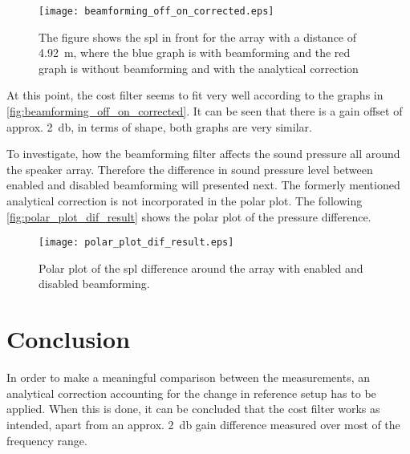   \begin{figure}[H]
	\centering
	\texttt{[image: beamforming\_off\_on\_corrected.eps]}
	\caption{The figure shows the \gls{spl} in front for the array with a distance of \SI{4.92}{\meter}, where the blue graph is with beamforming and the red graph is without beamforming and with the analytical correction}
		\label{fig:beamforming_off_on_corrected}
\end{figure}

At this point, the cost filter seems to fit very well according to the graphs in \autoref{fig:beamforming_off_on_corrected}. It can be seen that there is a gain offset of approx. \SI{2}{\decibel}, in terms of shape, both graphs are very similar. 

To investigate, how the beamforming filter affects the sound pressure all around the speaker array. Therefore the difference in sound pressure level between enabled and disabled beamforming will presented next. The formerly mentioned analytical correction is not incorporated in the polar plot. The following \autoref{fig:polar_plot_dif_result} shows the polar plot of the pressure difference. 


 \begin{figure}[H]
	\centering
	\texttt{[image: polar\_plot\_dif\_result.eps]}
	\caption{Polar plot of the \gls{spl} difference around the array with enabled and disabled beamforming.}
		\label{fig:polar_plot_dif_result}
\end{figure}




\section{Conclusion}
In order to make a meaningful comparison between the measurements, an analytical correction accounting for the change in reference setup has to be applied. When this is done, it can be concluded that the cost filter works as intended, apart from an approx. \SI{2}{\decibel} gain difference measured over most of the frequency range.


